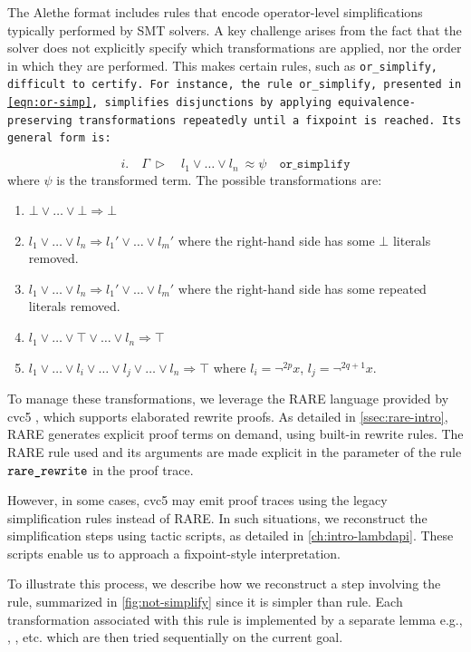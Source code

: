 The Alethe format includes rules that encode operator-level simplifications typically performed by SMT solvers.
A key challenge arises from the fact that the solver does not explicitly specify which transformations are applied, nor the order in which they are performed. This makes certain rules, such as \tt{or\_simplify}, difficult to certify.
For instance, the rule \texttt{or\_simplify}, presented in \cref{eqn:or-simp}, simplifies disjunctions by applying equivalence-preserving transformations repeatedly until a fixpoint is reached. Its general form is:

\begin{equation}\label{eqn:or-simp}
i. \quad \Gamma~\triangleright \quad l_1 \lor \dots \lor l_n ~ \approx \psi \quad \texttt{or\_simplify}
\end{equation}
where $\psi$ is the transformed term. The possible transformations are:
\begin{enumerate}
\item[(1)] $\bot \lor \dots \lor \bot \Rightarrow \bot$
\item[(2)] $l_1 \lor \dots \lor l_n \Rightarrow l_1' \lor \dots \lor l_m'$ where the right-hand side has some $\bot$ literals removed.
\item[(3)]  $l_1 \lor \dots \lor l_n \Rightarrow l_1' \lor \dots \lor l_m'$ where the right-hand side has some repeated literals removed.
\item[(4)] $l_1 \lor \dots \lor \top \lor \dots \lor l_n \Rightarrow \top$
\item[(5)] $l_1 \lor \dots \lor l_i \lor \dots \lor l_j \lor \dots \lor  l_n \Rightarrow \top$ where $l_i = \neg^{2p} x$, $l_j = \neg^{2q+1} x$.
\end{enumerate}

To manage these transformations, we leverage the RARE language provided by cvc5 \cite{rare}, which supports elaborated rewrite proofs.
As detailed in \cref{ssec:rare-intro}, RARE generates explicit proof terms on demand, using built-in rewrite rules.
The RARE rule used and its arguments are made explicit in the  parameter of the rule $\texttt{\upshape{rare\_rewrite}}$ in the proof trace.

However, in some cases, cvc5 may emit proof traces using the legacy simplification rules instead of RARE. In such situations, we reconstruct the simplification steps using tactic scripts, as detailed in \cref{ch:intro-lambdapi}.
These scripts enable us to approach a fixpoint-style interpretation.

To illustrate this process, we describe how we reconstruct a step involving the  rule, summarized in \cref{fig:not-simplify} since it is simpler than  rule.
Each transformation associated with this rule is implemented by a separate lemma e.g., , , etc. which are then tried sequentially on the current goal.


